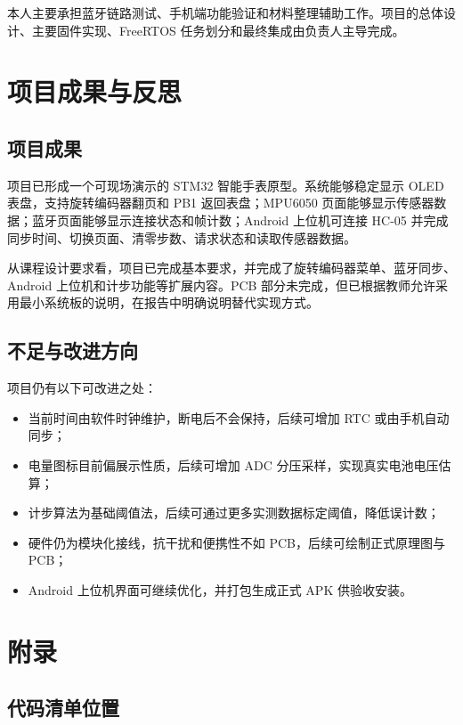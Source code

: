 \documentclass[UTF8,fontset=windows,12pt,a4paper]{ctexart}
\begin{document}
本人主要承担蓝牙链路测试、手机端功能验证和材料整理辅助工作。项目的总体设计、主要固件实现、FreeRTOS 任务划分和最终集成由负责人主导完成。

\section{项目成果与反思}

\subsection{项目成果}

项目已形成一个可现场演示的 STM32 智能手表原型。系统能够稳定显示 OLED 表盘，支持旋转编码器翻页和 PB1 返回表盘；MPU6050 页面能够显示传感器数据；蓝牙页面能够显示连接状态和帧计数；Android 上位机可连接 HC-05 并完成同步时间、切换页面、清零步数、请求状态和读取传感器数据。

从课程设计要求看，项目已完成基本要求，并完成了旋转编码器菜单、蓝牙同步、Android 上位机和计步功能等扩展内容。PCB 部分未完成，但已根据教师允许采用最小系统板的说明，在报告中明确说明替代实现方式。

\subsection{不足与改进方向}

项目仍有以下可改进之处：
\begin{itemize}[leftmargin=2em]
  \item 当前时间由软件时钟维护，断电后不会保持，后续可增加 RTC 或由手机自动同步；
  \item 电量图标目前偏展示性质，后续可增加 ADC 分压采样，实现真实电池电压估算；
  \item 计步算法为基础阈值法，后续可通过更多实测数据标定阈值，降低误计数；
  \item 硬件仍为模块化接线，抗干扰和便携性不如 PCB，后续可绘制正式原理图与 PCB；
  \item Android 上位机界面可继续优化，并打包生成正式 APK 供验收安装。
\end{itemize}

\section{附录}

\subsection{代码清单位置}
\end{document}
